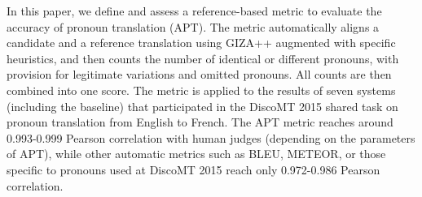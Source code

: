 In this paper, we define and assess a reference-based metric to evaluate the accuracy of pronoun translation (APT). The metric automatically aligns a candidate and a reference translation using GIZA++ augmented with specific heuristics, and then counts the number of identical or different pronouns, with provision for legitimate variations and omitted pronouns.  All counts are then combined into one score.  The metric is applied to the results of seven systems (including the baseline) that participated in the DiscoMT 2015 shared task on pronoun translation from English to French. The APT metric reaches around 0.993-0.999 Pearson correlation with human judges (depending on the parameters of APT), while other automatic metrics such as BLEU, METEOR, or those specific to pronouns used at DiscoMT 2015 reach only 0.972-0.986 Pearson correlation.
